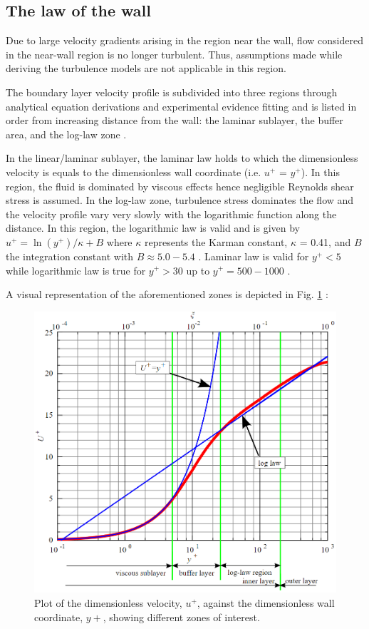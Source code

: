 \subsection{The law of the wall}
Due to large velocity gradients arising in the region near the wall, flow considered in the near-wall region is no longer turbulent. Thus, assumptions made while deriving the turbulence models are not applicable in this region.

The boundary layer velocity profile is subdivided into three regions through analytical equation derivations and experimental evidence fitting and is listed in order from increasing distance from the wall: the laminar sublayer, the buffer area, and the log-law zone \cite{Chen1998, Blocken2004}.

In the linear/laminar sublayer, the laminar law holds to which the dimensionless velocity is equals to the dimensionless wall coordinate (i.e. $u^+$ = $y^+$). In this region, the fluid is dominated by viscous effects hence negligible Reynolds shear stress is assumed. In the log-law zone, turbulence stress dominates the flow and the velocity profile vary very slowly with the logarithmic function along the distance. In this region, the logarithmic law is valid and is given by $u^+ = \ln(y^+)/\kappa+B$ where $\kappa$ represents the Karman constant, $\kappa$ = 0.41, and $B$ the integration constant with $B \approx 5.0-5.4$ \cite{Schlichting1960, White2006}. Laminar law is valid for $y^+ <5$ while logarithmic law is true for $y^+ > 30$ up to $y^+ = 500-1000$ \cite{Blocken2007}.

A visual representation of the aforementioned zones is depicted in Fig. \ref{fig:LawOfTheWall} \cite{Nezu2000}:
\newpage
\begin{figure}[ht]
	\centering
	\caption{Plot of the dimensionless velocity, $u^+$, against the dimensionless wall coordinate, $y+$, showing different zones of interest.}
	\label{fig:LawOfTheWall}
	\includegraphics[width=0.5\linewidth]{Figures/LawOfTheWall.png}
\end{figure} 

